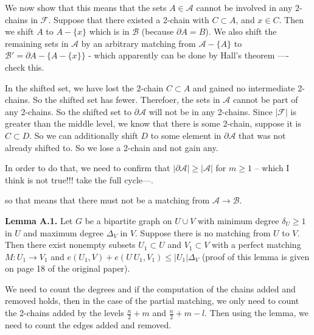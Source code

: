 \documentclass[11pt]{article}
\newcommand{\F}{\mathcal{F}}
\newcommand{\A}{\mathcal{A}}
\newcommand{\B}{\mathcal{B}}
\begin{document}
We now show that this means that the sets $A \in \A$ cannot be involved in any 2-chains in $\F$. Suppose that there existed a 2-chain with $C \subset A$, and $x \in C$. Then we shift $A$ to $A - \{ x \}$ which is in $\B$ (because $\partial A = B$). We also shift the remaining sets in $\A$ by an arbitrary matching from $\A - \{ A \}$ to $\B' = \partial A - \{ A - \{x\} \}$ - which apparently can be done by Hall's theorem ---- check this. 

In the shifted set, we have lost the 2-chain $C \subset A$ and gained no intermediate 2-chains. So the shifted set has fewer. Therefoer, the sets in $\A$ cannot be part of any 2-chains. So the shifted set to $\partial \A$ will not be in any 2-chains. Since $|\F|$ is greater than the middle level, we know that there is some 2-chain, suppose it is $C \subset D$. So we can additionally shift $D$ to some element in $\partial \A$ that was not already shifted to. So we lose a 2-chain and not gain any. 

In order to do that, we need to confirm that $|\partial \A| \geq |\A|$ for $m\geq 1$ -- which I think is not true!!! take the full cycle---. 

so that means that there must not be a matching from $\A \rightarrow \B$. 

\textbf{Lemma A.1.} Let $G$ be a bipartite graph on $U \cup V$ with minimum degree $\delta_U \geq 1$ in $U$ and maximum degree $\Delta_V$ in $V$. Suppose there is no matching from $U$ to $V$. Then there exist nonempty subsets $U_1 \subset U$ and $V_1 \subset V$ with a perfect matching $M: U_1 \to V_1$ and $e(U_1,V) + e(U \ U_1,V_1) \leq |U_1|\Delta_V$ (proof of this lemma is given on page 18 of the original paper).



We need to count the degrees and if the computation of the chains added and removed holds, then in the case of the partial matching, we only need to count the 2-chains added by the levels $\frac{n}{2}+m$ and $\frac{n}{2} + m - l$. Then using the lemma, we need to count the edges added and removed. 
\end{document}
